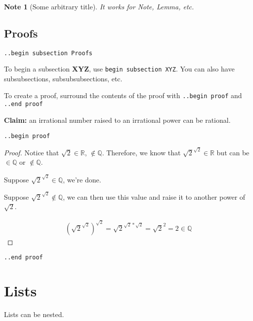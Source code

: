 \documentclass[12pt]{article}
\newcommand{\Q}{\mathbb{Q}}
\newcommand{\R}{\mathbb{R}}
\newcommand{\ital}{\emph}
\renewcommand\bold{\textbf}
\newtheorem{Note}[Lemma]{Note}
\begin{document}
\begin{flushleft}
\begin{Note}[Some arbitrary title]
It works for \ital{Note}, \ital{Lemma}, etc.
\end{Note}

\newpage

\subsection*{Proofs}
\verb|..begin subsection Proofs|

To begin a subsection \bold{XYZ}, use \verb|begin subsection XYZ|. You can also have subsubsections, subsubsubsections, etc.

To create a proof, surround the contents of the proof with \verb|..begin proof| and \verb|..end proof|

\bigskip

\bold{Claim:} an irrational number raised to an irrational power can be rational.

\medskip
\verb|..begin proof|
\begin{proof}

Notice that $\sqrt{2} \in \R$, $\notin \Q$. Therefore, we know that $\sqrt{2}^{\sqrt{2}} \in \R$ but can be $\in \Q$ or $\notin \Q$.

Suppose $\sqrt{2}^{\sqrt{2}} \in \Q$, we're done.

Suppose $\sqrt{2}^{\sqrt{2}} \notin \Q$, we can then use this value and raise it to another power of $\sqrt{2}$.

\begin{gather*}
(\sqrt{2}^{\sqrt{2}})^{\sqrt{2}} = \sqrt{2}^{\sqrt{2} * \sqrt{2}} = \sqrt{2}^2 = 2 \in \Q 
\end{gather*}
\end{proof}
\verb|..end proof|

\newpage

\section*{Lists}

Lists can be nested.


\end{flushleft}
\end{document}
